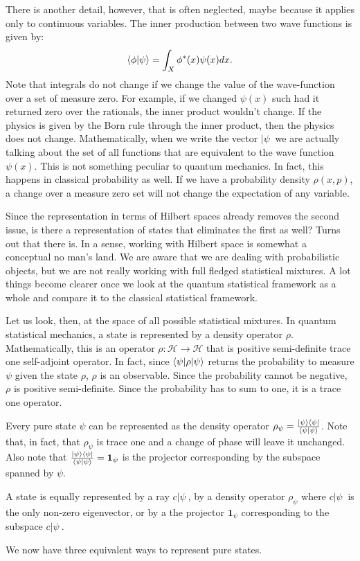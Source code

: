 There is another detail, however, that is often neglected, maybe because it applies only to continuous variables. The inner production between two wave functions is given by:
\begin{equation}
	\langle \phi | \psi \rangle = \int_X \phi^*(x) \psi(x) dx.
\end{equation}
Note that integrals do not change if we change the value of the wave-function over a set of measure zero. For example, if we changed $\psi(x)$ such had it returned zero over the rationals, the inner product wouldn't change. If the physics is given by the Born rule through the inner product, then the physics does not change. Mathematically, when we write the vector $|\psi \>$ we are actually talking about the set of all functions that are equivalent to the wave function $\psi(x)$. This is not something peculiar to quantum mechanics. In fact, this happens in classical probability as well. If we have a probability density $\rho(x,p)$, a change over a measure zero set will not change the expectation of any variable.

Since the representation in terms of Hilbert spaces already removes the second issue, is there a representation of states that eliminates the first as well? Turns out that there is. In a sense, working with Hilbert space is somewhat a conceptual no man's land. We are aware that we are dealing with probabilistic objects, but we are not really working with full fledged statistical mixtures. A lot things become clearer once we look at the quantum statistical framework as a whole and compare it to the classical statistical framework.

Let us look, then, at the space of all possible statistical mixtures. In quantum statistical mechanics, a state is represented by a density operator $\rho$. Mathematically, this is an operator $\rho : \mathcal{H} \to \mathcal{H}$ that is positive semi-definite trace one self-adjoint operator. In fact, since $\langle \psi | \rho | \psi \rangle$ returns the probability to measure $\psi$ given the state $\rho$, $\rho$ is an observable. Since the probability cannot be negative, $\rho$ is positive semi-definite. Since the probability has to sum to one, it is a trace one operator.

Every pure state $\psi$ can be represented as the density operator $\rho_{\psi} = \frac{| \psi \rangle \langle \psi |}{\langle \psi | \psi \rangle}$. Note that, in fact, that $\rho_{\psi}$ is trace one and a change of phase will leave it unchanged. Also note that $\frac{| \psi \rangle \langle \psi |}{\langle \psi | \psi \rangle} = \mathbf{1}_{\psi}$ is the projector corresponding by the subspace spanned by $\psi$.
\begin{insight}
	A state is equally represented by a ray $c|\psi\>$, by a density operator $\rho_{\psi}$ where $c|\psi\>$ is the only non-zero eigenvector, or by a the projector $\mathbf{1}_{\psi}$ corresponding to the subspace $c|\psi\>$.
\end{insight}
We now have three equivalent ways to represent pure states.

